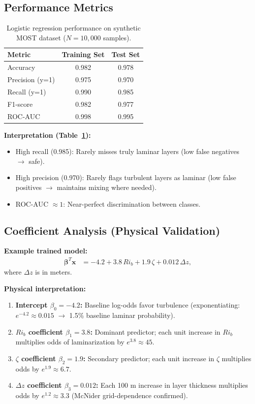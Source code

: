 \documentclass[11pt]{article}
\begin{document}
\subsection{Performance Metrics}

\begin{table}[h]
\centering
\begin{tabular}{lcc}
\hline
\textbf{Metric} & \textbf{Training Set} & \textbf{Test Set} \\
\hline
Accuracy & 0.982 & 0.978 \\
Precision (y=1) & 0.975 & 0.970 \\
Recall (y=1) & 0.990 & 0.985 \\
F1-score & 0.982 & 0.977 \\
ROC-AUC & 0.998 & 0.995 \\
\hline
\end{tabular}
\caption{Logistic regression performance on synthetic MOST dataset ($N=10{,}000$ samples).}
\label{tab:performance}
\end{table}

\textbf{Interpretation (Table~\ref{tab:performance}):}
\begin{itemize}[leftmargin=*]
\item High recall (0.985): Rarely misses truly laminar layers (low false negatives $\to$ safe).
\item High precision (0.970): Rarely flags turbulent layers as laminar (low false positives $\to$ maintains mixing where needed).
\item ROC-AUC $\approx 1$: Near-perfect discrimination between classes.
\end{itemize}

\subsection{Coefficient Analysis (Physical Validation)}

\textbf{Example trained model:}
\begin{align}
\boldsymbol{\beta}^T \mathbf{x} &= -4.2 + 3.8 \, Ri_b + 1.9 \, \zeta + 0.012 \, \Delta z, \label{eq:trained_coefficients}
\end{align}
where $\Delta z$ is in meters.

\textbf{Physical interpretation:}
\begin{enumerate}[leftmargin=*]
\item \textbf{Intercept $\beta_0 = -4.2$:} Baseline log-odds favor turbulence (exponentiating: $e^{-4.2} \approx 0.015$ $\to$ 1.5\% baseline laminar probability).
\item \textbf{$Ri_b$ coefficient $\beta_1 = 3.8$:} Dominant predictor; each unit increase in $Ri_b$ multiplies odds of laminarization by $e^{3.8} \approx 45$.
\item \textbf{$\zeta$ coefficient $\beta_2 = 1.9$:} Secondary predictor; each unit increase in $\zeta$ multiplies odds by $e^{1.9} \approx 6.7$.
\item \textbf{$\Delta z$ coefficient $\beta_3 = 0.012$:} Each 100 m increase in layer thickness multiplies odds by $e^{1.2} \approx 3.3$ (McNider grid-dependence confirmed).
\end{enumerate}
\end{document}
